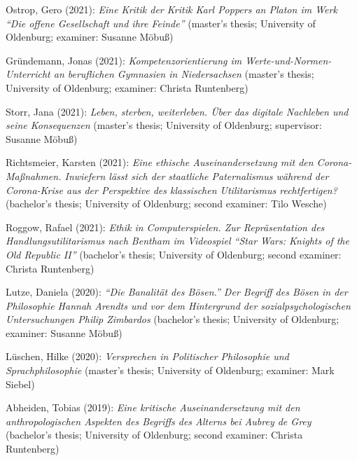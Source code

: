 \documentclass[a4paper,10pt]{article}
\newenvironment{literature}{%
   \parskip6pt\parindent0pt\raggedright
   \def\lititem{\hangindent=1cm\hangafter1}}{%
   \par\ignorespaces}
\begin{document}
\begin{literature}
\lititem Ostrop, Gero (2021): \textit{Eine Kritik der Kritik Karl Poppers an Platon im Werk \enquote{Die offene Gesellschaft und ihre Feinde}} (master's thesis; University of Oldenburg; examiner: Susanne Möbuß)

\lititem Gründemann, Jonas (2021): \textit{Kompetenzorientierung im Werte-und-Normen-Unterricht an beruflichen Gymnasien in Niedersachsen} (master's thesis; University of Oldenburg; examiner: Christa Runtenberg)

\lititem Storr, Jana (2021): \textit{Leben, sterben, weiterleben. Über das digitale Nachleben und seine Konsequenzen} (master's thesis; University of Oldenburg; supervisor: Susanne Möbuß)

\lititem Richtsmeier, Karsten (2021): \textit{Eine ethische Auseinandersetzung mit den Corona-Maßnahmen. Inwiefern lässt sich der staatliche Paternalismus während der Corona-Krise aus der Perspektive des klassischen Utilitarismus rechtfertigen?} (bachelor's thesis; University of Oldenburg; second examiner: Tilo Wesche)

\lititem Roggow, Rafael (2021): \textit{Ethik in Computerspielen. Zur Repräsentation des Handlungsutilitarismus nach Bentham im Videospiel \enquote{Star Wars: Knights of the Old Republic II}} (bachelor's thesis; University of Oldenburg; second examiner: Christa Runtenberg)

\lititem Lutze, Daniela (2020): \textit{\enquote{Die Banalität des Bösen.} Der Begriff des Bösen in der Philosophie Hannah Arendts und vor dem Hintergrund der sozialpsychologischen Untersuchungen Philip Zimbardos} (bachelor's thesis; University of Oldenburg; examiner: Susanne Möbuß)

\lititem Lüschen, Hilke (2020): \textit{Versprechen in Politischer Philosophie und Sprachphilosophie} (master's thesis; University of Oldenburg; examiner: Mark Siebel)

\lititem Abheiden, Tobias (2019): \textit{Eine kritische Auseinandersetzung mit den anthropologischen Aspekten des Begriffs des Alterns bei Aubrey de Grey} (bachelor's thesis; University of Oldenburg; second examiner: Christa Runtenberg)
\end{literature}


\clearpage
\end{document}
